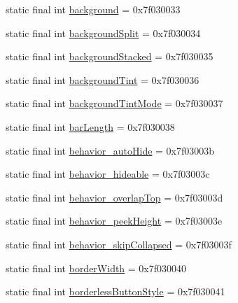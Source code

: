 \begin{DoxyCompactItemize}
\item 
static final int \mbox{\hyperlink{classandroid_1_1support_1_1design_1_1_r_1_1attr_a633e86200cd9774275242631c63985ee}{background}} = 0x7f030033
\item 
static final int \mbox{\hyperlink{classandroid_1_1support_1_1design_1_1_r_1_1attr_ac7943a5fbb475fbbfe90e0a5a6622afb}{background\+Split}} = 0x7f030034
\item 
static final int \mbox{\hyperlink{classandroid_1_1support_1_1design_1_1_r_1_1attr_a67ec9129f83e25973c54736f26ebb03b}{background\+Stacked}} = 0x7f030035
\item 
static final int \mbox{\hyperlink{classandroid_1_1support_1_1design_1_1_r_1_1attr_aa714e7de34a4c22bd4a43350611f6424}{background\+Tint}} = 0x7f030036
\item 
static final int \mbox{\hyperlink{classandroid_1_1support_1_1design_1_1_r_1_1attr_a5c4554ea65007751ccc0078bde491065}{background\+Tint\+Mode}} = 0x7f030037
\item 
static final int \mbox{\hyperlink{classandroid_1_1support_1_1design_1_1_r_1_1attr_aed76efd8f3192670d26289e5d1a6a94e}{bar\+Length}} = 0x7f030038
\item 
static final int \mbox{\hyperlink{classandroid_1_1support_1_1design_1_1_r_1_1attr_ae6f0cad2e8e6fae4a352cfb5632ef478}{behavior\+\_\+auto\+Hide}} = 0x7f03003b
\item 
static final int \mbox{\hyperlink{classandroid_1_1support_1_1design_1_1_r_1_1attr_adf7a41388cc8e5a7f86a64a79d7a85dd}{behavior\+\_\+hideable}} = 0x7f03003c
\item 
static final int \mbox{\hyperlink{classandroid_1_1support_1_1design_1_1_r_1_1attr_a6bd3a8ada6445384f29a7b94a7679090}{behavior\+\_\+overlap\+Top}} = 0x7f03003d
\item 
static final int \mbox{\hyperlink{classandroid_1_1support_1_1design_1_1_r_1_1attr_ad10467c4b1c49d1ee143f735c64a16fb}{behavior\+\_\+peek\+Height}} = 0x7f03003e
\item 
static final int \mbox{\hyperlink{classandroid_1_1support_1_1design_1_1_r_1_1attr_aff8d1708123c2c9612b66c0fdcb20e45}{behavior\+\_\+skip\+Collapsed}} = 0x7f03003f
\item 
static final int \mbox{\hyperlink{classandroid_1_1support_1_1design_1_1_r_1_1attr_a0b9b9703ae190c90c9130ba940edfe1a}{border\+Width}} = 0x7f030040
\item 
static final int \mbox{\hyperlink{classandroid_1_1support_1_1design_1_1_r_1_1attr_af2eab970fb1e3e757b04a40b2552d82e}{borderless\+Button\+Style}} = 0x7f030041

\end{DoxyCompactItemize}
